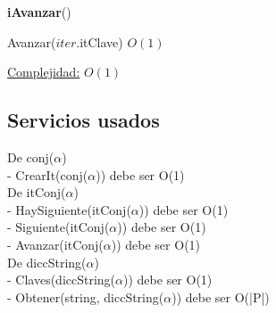 \begin{Algoritmos}

\begin{algorithm}[H]
{\textbf{iAvanzar}()}
\begin{algorithmic}[1]

\State Avanzar($iter$.itClave) \Comment $O(1)$

\medskip
\Statex \underline{Complejidad:} $O(1)$

\end{algorithmic}
\end{algorithm}

\end{Algoritmos}  
  
\subsection{Servicios usados}

De conj($\alpha$) \\
- CrearIt(conj($\alpha$)) debe ser O(1) \\

De itConj($\alpha$) \\
- HaySiguiente(itConj($\alpha$)) debe ser O(1) \\
- Siguiente(itConj($\alpha$)) debe ser O(1) \\
- Avanzar(itConj($\alpha$)) debe ser O(1) \\

De diccString($\alpha$) \\
- Claves(diccString($\alpha$)) debe ser O(1) \\
- Obtener(string, diccString($\alpha$)) debe ser O(|P|) \\

